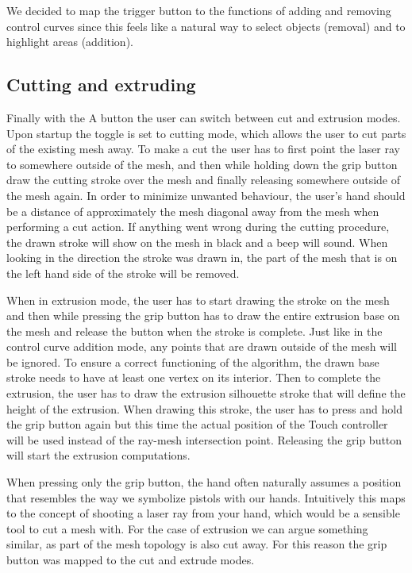 We decided to map the trigger button to the functions of adding and removing control curves since this feels like a natural way to select objects (removal) and to highlight areas (addition).

\subsection{Cutting and extruding}
Finally with the A button the user can switch between cut and extrusion modes. Upon startup the toggle is set to cutting mode, which allows the user to cut parts of the existing mesh away. To make a cut the user has to first point the laser ray to somewhere outside of the mesh, and then while holding down the grip button draw the cutting stroke over the mesh and finally releasing somewhere outside of the mesh again. In order to minimize unwanted behaviour, the user's hand should be a distance of approximately the mesh diagonal away from the mesh when performing a cut action. If anything went wrong during the cutting procedure, the drawn stroke will show on the mesh in black and a beep will sound. When looking in the direction the stroke was drawn in, the part of the mesh that is on the left hand side of the stroke will be removed.

When in extrusion mode, the user has to start drawing the stroke on the mesh and then while pressing the grip button has to draw the entire extrusion base on the mesh and release the button when the stroke is complete. Just like in the control curve addition mode, any points that are drawn outside of the mesh will be ignored. To ensure a correct functioning of the algorithm, the drawn base stroke needs to have at least one vertex on its interior. Then to complete the extrusion, the user has to draw the extrusion silhouette stroke that will define the height of the extrusion. When drawing this stroke, the user has to press and hold the grip button again but this time the actual position of the Touch controller will be used instead of the ray-mesh intersection point. Releasing the grip button will start the extrusion computations.

When pressing only the grip button, the hand often naturally assumes a position that resembles the way we symbolize pistols with our hands. Intuitively this maps to the concept of shooting a laser ray from your hand, which would be a sensible tool to cut a mesh with. For the case of extrusion we can argue something similar, as part of the mesh topology is also cut away. For this reason the grip button was mapped to the cut and extrude modes.